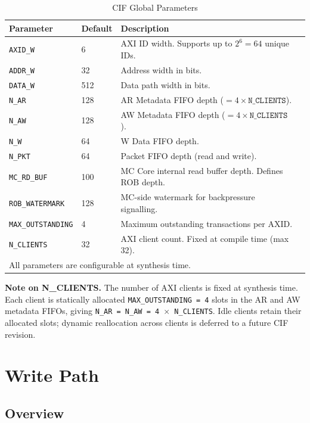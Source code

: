 \begin{table}[h]
\centering
\begin{tabular}{llll}
\toprule
\textbf{Parameter} & \textbf{Default} & \textbf{Description} \\
\midrule
\texttt{AXID\_W}         & 6     & AXI ID width. Supports up to $2^6 = 64$ unique IDs. \\
\texttt{ADDR\_W}         & 32    & Address width in bits. \\
\texttt{DATA\_W}         & 512   & Data path width in bits. \\
\texttt{N\_AR}           & 128   & AR Metadata FIFO depth ($= 4 \times \texttt{N\_CLIENTS}$). \\
\texttt{N\_AW}           & 128   & AW Metadata FIFO depth ($= 4 \times \texttt{N\_CLIENTS}$). \\
\texttt{N\_W}            & 64    & W Data FIFO depth. \\
\texttt{N\_PKT}          & 64    & Packet FIFO depth (read and write). \\
\texttt{MC\_RD\_BUF}     & 100    & MC Core internal read buffer depth. Defines ROB depth. \\
\texttt{ROB\_WATERMARK}  & 128    & MC-side watermark for backpressure signalling. \\
\texttt{MAX\_OUTSTANDING}& 4     & Maximum outstanding transactions per AXID. \\
\texttt{N\_CLIENTS}      & 32    & AXI client count. Fixed at compile time (max 32). \\
\midrule
\multicolumn{3}{l}{\small All parameters are configurable at synthesis time.} \\
\bottomrule
\end{tabular}
\caption{CIF Global Parameters}
\end{table}

\textbf{Note on N\_CLIENTS.} The number of AXI clients is fixed at synthesis time. Each client is statically allocated \texttt{MAX\_OUTSTANDING = 4} slots in the AR and AW metadata FIFOs, giving \texttt{N\_AR = N\_AW = 4 $\times$ N\_CLIENTS}. Idle clients retain their allocated slots; dynamic reallocation across clients is deferred to a future CIF revision.

\section{Write Path}

\subsection{Overview}

